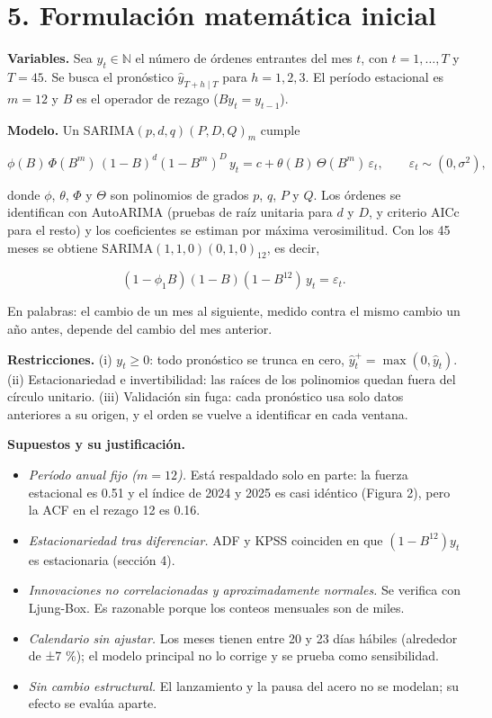 \documentclass[
  spanish,
  11pt,
]{article}
\providecommand{\tightlist}{%
  \setlength{\itemsep}{0pt}\setlength{\parskip}{0pt}}
\begin{document}
\section{5. Formulación matemática
inicial}\label{formulaciuxf3n-matemuxe1tica-inicial}

\textbf{Variables.} Sea \(y_t \in \mathbb{N}\) el número de órdenes
entrantes del mes \(t\), con \(t = 1, \dots, T\) y \(T = 45\). Se busca
el pronóstico \(\hat y_{T+h \mid T}\) para \(h = 1, 2, 3\). El período
estacional es \(m = 12\) y \(B\) es el operador de rezago
(\(B y_t = y_{t-1}\)).

\textbf{Modelo.} Un SARIMA\((p,d,q)(P,D,Q)_m\) cumple

\[\phi(B)\,\Phi(B^m)\,(1-B)^d(1-B^m)^D\, y_t = c + \theta(B)\,\Theta(B^m)\,\varepsilon_t, \qquad \varepsilon_t \sim (0, \sigma^2),\]

donde \(\phi\), \(\theta\), \(\Phi\) y \(\Theta\) son polinomios de
grados \(p\), \(q\), \(P\) y \(Q\). Los órdenes se identifican con
AutoARIMA (pruebas de raíz unitaria para \(d\) y \(D\), y criterio AICc
para el resto) y los coeficientes se estiman por máxima verosimilitud.
Con los 45 meses se obtiene SARIMA\((1,1,0)(0,1,0)_{12}\), es decir,

\[(1-\phi_1 B)(1-B)(1-B^{12})\,y_t = \varepsilon_t.\]

En palabras: el cambio de un mes al siguiente, medido contra el mismo
cambio un año antes, depende del cambio del mes anterior.

\textbf{Restricciones.} (i) \(y_t \ge 0\): todo pronóstico se trunca en
cero, \(\hat y^{+}_{t} = \max(0, \hat y_t)\). (ii) Estacionariedad e
invertibilidad: las raíces de los polinomios quedan fuera del círculo
unitario. (iii) Validación sin fuga: cada pronóstico usa solo datos
anteriores a su origen, y el orden se vuelve a identificar en cada
ventana.

\textbf{Supuestos y su justificación.}

\begin{itemize}
\tightlist
\item
  \emph{Período anual fijo (\(m = 12\)).} Está respaldado solo en parte:
  la fuerza estacional es 0.51 y el índice de 2024 y 2025 es casi
  idéntico (Figura 2), pero la ACF en el rezago 12 es 0.16.
\item
  \emph{Estacionariedad tras diferenciar.} ADF y KPSS coinciden en que
  \((1-B^{12})y_t\) es estacionaria (sección 4).
\item
  \emph{Innovaciones no correlacionadas y aproximadamente normales.} Se
  verifica con Ljung-Box. Es razonable porque los conteos mensuales son
  de miles.
\item
  \emph{Calendario sin ajustar.} Los meses tienen entre 20 y 23 días
  hábiles (alrededor de ±7 \%); el modelo principal no lo corrige y se
  prueba como sensibilidad.
\item
  \emph{Sin cambio estructural.} El lanzamiento y la pausa del acero no
  se modelan; su efecto se evalúa aparte.
\end{itemize}
\end{document}
